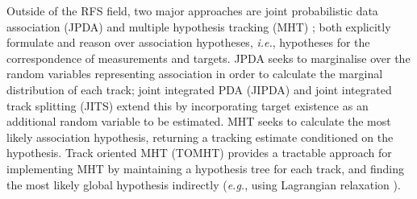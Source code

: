 \documentclass[journal,twoside]{IEEEtran}
\theoremstyle{plain}
\begin{document}
Outside of the RFS field, two major approaches are joint probabilistic data association (JPDA) \cite{ForBar83} and multiple hypothesis tracking (MHT) \cite{Rei79}; both explicitly formulate and reason over association hypotheses, \textit{i.e.}\xspace, hypotheses for the correspondence of measurements and targets. JPDA seeks to marginalise over the random variables representing association in order to calculate the marginal distribution of each track; joint integrated PDA (JIPDA) \cite{MusEva04,ChaMor11} and joint integrated track splitting (JITS) \cite{MusEva09,ChaMor11} extend this by incorporating target existence as an additional random variable to be estimated. MHT seeks to calculate the most likely association hypothesis, returning a tracking estimate conditioned on the hypothesis. Track oriented MHT (TOMHT) \cite{Kur90} provides a tractable approach for implementing MHT by maintaining a hypothesis tree for each track, and finding the most likely global hypothesis indirectly (\textit{e.g.}\xspace, using Lagrangian relaxation \cite{PooGad06}).

\IEEEpubidadjcol
\end{document}
